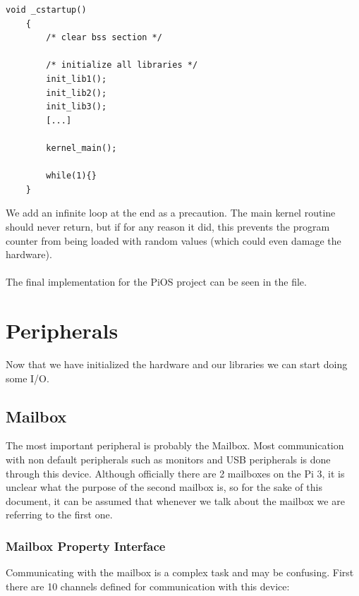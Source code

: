 \documentclass[12pt, svgnames]{book}
\begin{document}
\begin{lstlisting}[style = C]
	void _cstartup()
	{
		/* clear bss section */
		
		/* initialize all libraries */
		init_lib1();
		init_lib2();
		init_lib3();
		[...]
		
		kernel_main();
		
		while(1){}
	}
\end{lstlisting}

We add an infinite loop at the end as a precaution. The main kernel routine should never return, but if for any reason it did, this prevents the program counter from being loaded with random values (which could even damage the hardware).
\\~\\
The final implementation for the PiOS project can be seen in the \href{https://github.com/Makogan/PiOS/blob/master/source/boot/cstartup.c}{} file.

\chapter{Peripherals}

Now that we have initialized the hardware and our libraries we can start doing some I/O.

\section{Mailbox}
\label{sec:mailbox}

The most important peripheral is probably the Mailbox. Most communication with non default peripherals such as monitors and USB peripherals is done through this device. Although officially there are 2 mailboxes on the Pi 3, it is unclear what the purpose of the second mailbox is, so for the sake of this document, it can be assumed that whenever we talk about the mailbox we are referring to the first one. 

\subsection{Mailbox Property Interface}

Communicating with the mailbox is a complex task and may be confusing. First there are 10 channels defined for communication with this device:
\end{document}

